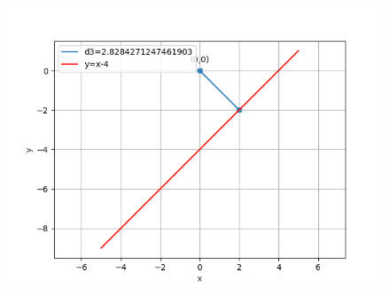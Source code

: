 \documentclass[12pt]{article}
\begin{document}
\begin{enumerate}
\begin{figure}[H]
\begin{center}
	    \includegraphics[width=\columnwidth]{figs/line3.png}
	\end{center}
\caption{}
\label{fig:Fig3}
\end{figure}
\end{enumerate}
\end{document}
